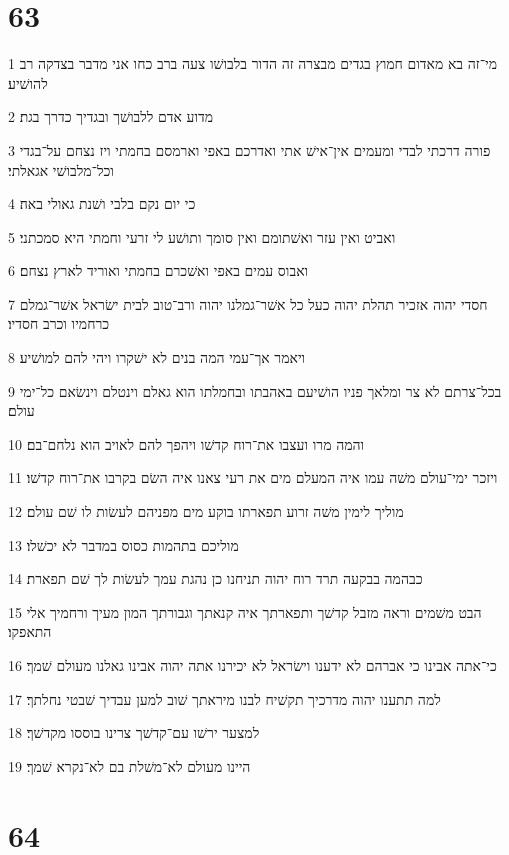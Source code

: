 \chapter{63}

\par 1 מי־זה בא מאדום חמוץ בגדים מבצרה זה הדור בלבושׁו צעה ברב כחו אני מדבר בצדקה רב להושׁיע׃
\par 2 מדוע אדם ללבושׁך ובגדיך כדרך בגת׃
\par 3 פורה דרכתי לבדי ומעמים אין־אישׁ אתי ואדרכם באפי וארמסם בחמתי ויז נצחם על־בגדי וכל־מלבושׁי אגאלתי׃
\par 4 כי יום נקם בלבי ושׁנת גאולי באה׃
\par 5 ואביט ואין עזר ואשׁתומם ואין סומך ותושׁע לי זרעי וחמתי היא סמכתני׃
\par 6 ואבוס עמים באפי ואשׁכרם בחמתי ואוריד לארץ נצחם׃
\par 7 חסדי יהוה אזכיר תהלת יהוה כעל כל אשׁר־גמלנו יהוה ורב־טוב לבית ישׂראל אשׁר־גמלם כרחמיו וכרב חסדיו׃
\par 8 ויאמר אך־עמי המה בנים לא ישׁקרו ויהי להם למושׁיע׃
\par 9 בכל־צרתם לא צר ומלאך פניו הושׁיעם באהבתו ובחמלתו הוא גאלם וינטלם וינשׂאם כל־ימי עולם׃
\par 10 והמה מרו ועצבו את־רוח קדשׁו ויהפך להם לאויב הוא נלחם־בם׃
\par 11 ויזכר ימי־עולם משׁה עמו איה המעלם מים את רעי צאנו איה השׂם בקרבו את־רוח קדשׁו׃
\par 12 מוליך לימין משׁה זרוע תפארתו בוקע מים מפניהם לעשׂות לו שׁם עולם׃
\par 13 מוליכם בתהמות כסוס במדבר לא יכשׁלו׃
\par 14 כבהמה בבקעה תרד רוח יהוה תניחנו כן נהגת עמך לעשׂות לך שׁם תפארת׃
\par 15 הבט משׁמים וראה מזבל קדשׁך ותפארתך איה קנאתך וגבורתך המון מעיך ורחמיך אלי התאפקו׃
\par 16 כי־אתה אבינו כי אברהם לא ידענו וישׂראל לא יכירנו אתה יהוה אבינו גאלנו מעולם שׁמך׃
\par 17 למה תתענו יהוה מדרכיך תקשׁיח לבנו מיראתך שׁוב למען עבדיך שׁבטי נחלתך׃
\par 18 למצער ירשׁו עם־קדשׁך צרינו בוססו מקדשׁך׃
\par 19 היינו מעולם לא־משׁלת בם לא־נקרא שׁמך׃

\chapter{64}

